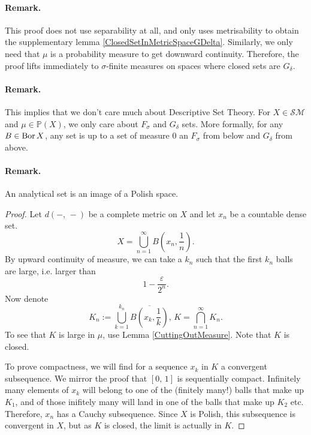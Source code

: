 \paragraph{Remark.} This proof does not use separability at all, and only uses metrisability to obtain the supplementary lemma \ref{ClosedSetInMetricSpaceGDelta}. Similarly, we only need that \( \mu \) is a probability measure to get downward continuity. Therefore, the proof lifts immediately to \( \sigma \)-finite measures on spaces where closed sets are \( G_\delta \).

\paragraph{Remark.} This implies that we don't care much about Descriptive Set Theory. For \( X \in \mathcal{SM} \) and \( \mu \in \mathbb{P}(X) \), we only care about \( F_\sigma \) and \( G_\delta \) sets. More formally, for any \( B \in \operatorname{Bor} X \), any set is up to a set of measure \( 0 \) an \( F_\sigma \) from below and \( G_\delta \) from above.

\paragraph{Remark.} An analytical set is an image of a Polish space.


\begin{proof}
Let \( d(-,\, -) \) be a complete metric on \( X \) and let \( x_n \) be a countable dense set. 
\[ 
    X = \bigcup_{n = 1}^\infty B \left( x_n, \frac{1}{n} \right). 
\]
By upward continuity of measure, we can take a \( k_n \) such that the first \( k_n \) balls are large, i.e. larger than
\[ 
1 - \frac{\varepsilon}{2^n}. 
\]
Now denote
\[ 
    K_n := \bigcup_{k = 1}^{k_n} \overline{B \left( x_k, \frac{1}{k} \right)},\, K = \bigcap_{n = 1}^\infty K_n.
\]
To see that \( K \) is large in \( \mu \), use Lemma \ref{CuttingOutMeasure}. Note that \( K \) is closed.

To prove compactness, we will find for a sequence \( x_k \) in \( K \) a convergent subsequence. We mirror the proof that \( [0,\,1] \) is sequentially compact. Infinitely many elements of \( x_k \) will belong to one of the (finitely many!) balls that make up \( K_1 \), and of those inifitely many will land in one of the balls that make up \( K_2 \) etc. Therefore, \( x_n \) has a Cauchy subsequence. Since \( X \) is Polish, this subsequence is convergent in \( X \), but as \( K \) is closed, the limit is actually in \( K \).
\end{proof}

